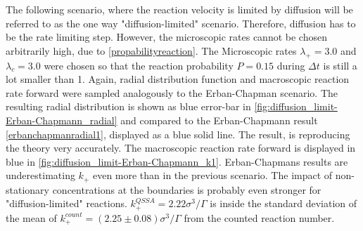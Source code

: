 \documentclass[
  a4paper,BCOR10mm,twoside,
  headsepline,footsepline,%
  fleqn,openbib
]{scrbook}
\begin{document}

The following scenario, where the reaction velocity is limited by diffusion will be referred to as the one way "diffusion-limited" scenario. Therefore, diffusion has to be the rate limiting step. However, the microscopic rates cannot be chosen arbitrarily high, due to \cref{propabilityreaction}. The Microscopic rates $\lambda_+=3.0$ and $\lambda_c=3.0$ were chosen so that the reaction probability $P=0.15$  during $\Delta t$ is still a lot smaller than 1. Again,  radial distribution function and macroscopic reaction rate forward were sampled analogously to the Erban-Chapman scenario. The resulting radial distribution is shown as blue error-bar in \cref{fig:diffusion_limit-Erban-Chapmann_radial} and compared to the Erban-Chapmann result \ref{erbanchapmanradial1}, displayed as a blue solid line. The result, is reproducing the theory very accurately. The macroscopic reaction rate forward is displayed in blue in \cref{fig:diffusion_limit-Erban-Chapmann_k1}. Erban-Chapmans results are underestimating  $k_+$ even more than in the previous scenario. The impact of non-stationary concentrations at the boundaries is probably even stronger for "diffusion-limited" reactions.  $k^{QSSA}_{+}=2.22 \sigma^3/\Gamma$ is inside the standard deviation of the mean of $k^{count}_{+}=(2.25\pm0.08)\sigma^3/\Gamma$ from the counted reaction number.\par
\end{document}
